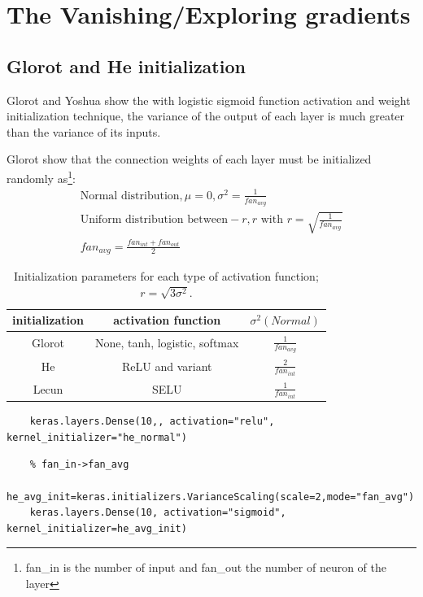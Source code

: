 \documentclass[12pt, a4paper]{book}
\begin{document}
\section{The Vanishing/Exploring gradients}

\subsection*{Glorot and He initialization}
Glorot and Yoshua show the with logistic sigmoid function activation and weight initialization technique, the variance of the output of each layer is much greater than the variance of its inputs.

Glorot show that the connection weights of each layer must be initialized randomly as\footnote{fan\_in is the number of input and fan\_out the number of neuron of the layer}:
\begin{eqnarray}
	\text{Normal distribution} , \mu =0, \sigma^2 =\frac{1}{fan_{avg}}\\
	\text{Uniform distribution between}-r,r\text{ with } r=\sqrt{\frac{1}{fan_{avg}}}\\
	fan_{avg}=\frac{fan_{int}+fan_{out}}{2}
\end{eqnarray}

\begin{table}[H]
	\centering
	\begin{tabular}{c|c|c}
		\hline 
		initialization & activation function & $\sigma^2(Normal)$\\
		\hline 
		Glorot & None, tanh, logistic, softmax&$\frac{1}{fan_{avg}}$\\
		He&ReLU and variant&$\frac{2}{fan_{int}}$\\
		Lecun&SELU&$\frac{1}{fan_{int}}$\\
		\hline 
	\end{tabular}
	\caption{Initialization parameters for each type of activation function; $r=\sqrt{3\sigma^2}$.}
\end{table}


\begin{verbatim}
	keras.layers.Dense(10,, activation="relu", kernel_initializer="he_normal")
\end{verbatim}

\begin{verbatim}
	% fan_in->fan_avg
	he_avg_init=keras.initializers.VarianceScaling(scale=2,mode="fan_avg")
	keras.layers.Dense(10, activation="sigmoid", kernel_initializer=he_avg_init)
\end{verbatim}
\end{document}

